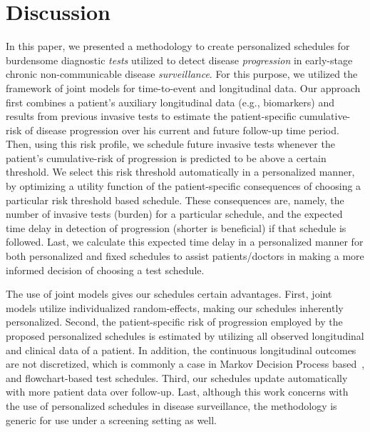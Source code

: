 \section{Discussion}
\label{sec:discussion}
In this paper, we presented a methodology to create personalized schedules for burdensome diagnostic \textit{tests} utilized to detect disease \textit{progression} in early-stage chronic non-communicable disease \textit{surveillance}. For this purpose, we utilized the framework of joint models for time-to-event and longitudinal data. Our approach first combines a patient's auxiliary longitudinal data (e.g., biomarkers) and results from previous invasive tests to estimate the patient-specific cumulative-risk of disease progression over his current and future follow-up time period. Then, using this risk profile, we schedule future invasive tests whenever the patient's cumulative-risk of progression is predicted to be above a certain threshold. We select this risk threshold automatically in a personalized manner, by optimizing a utility function of the patient-specific consequences of choosing a particular risk threshold based schedule. These consequences are, namely, the number of invasive tests (burden) for a particular schedule, and the expected time delay in detection of progression (shorter is beneficial) if that schedule is followed. Last, we calculate this expected time delay in a personalized manner for both personalized and fixed schedules to assist patients/doctors in making a more informed decision of choosing a test schedule.

The use of joint models gives our schedules certain advantages. First, joint models utilize individualized random-effects, making our schedules inherently personalized. Second, the patient-specific risk of progression employed by the proposed personalized schedules is estimated by utilizing all observed longitudinal and clinical data of a patient. In addition, the continuous longitudinal outcomes are not discretized, which is commonly a case in Markov Decision Process based~\citep{alagoz2010operations, steimle2017markov}, and flowchart-based test schedules. Third, our schedules update automatically with more patient data over follow-up. Last, although this work concerns with the use of personalized schedules in disease surveillance, the methodology is generic for use under a screening setting as well.

